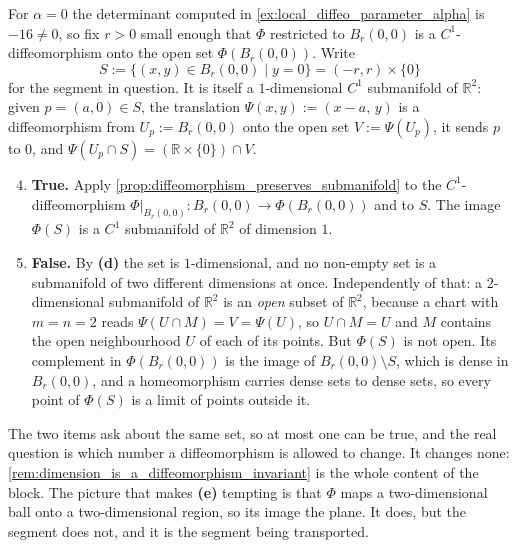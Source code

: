 \begin{exercisesolution}
\label{sol:image_of_segment_submanifold}
For $\alpha = 0$ the determinant computed in \cref{ex:local_diffeo_parameter_alpha} is
$-16 \neq 0$, so fix $r > 0$ small enough that $\Phi$ restricted to $B_r(0,0)$ is a
$C^1$-diffeomorphism onto the open set $\Phi(B_r(0,0))$. Write
\[S := \{(x,y) \in B_r(0,0) \mid y = 0\} = (-r,r) \times \{0\}\]
for the segment in question. It is itself a $1$-dimensional $C^1$ submanifold of $\mathbb{R}^2$:
given $p = (a,0) \in S$, the translation $\Psi(x,y) := (x-a,\, y)$ is a diffeomorphism from
$U_p := B_r(0,0)$ onto the open set $V := \Psi(U_p)$, it sends $p$ to $0$, and
$\Psi(U_p \cap S) = (\mathbb{R}\times\{0\}) \cap V$.
\begin{enumerate}[label=\textbf{(\alph*)}]
  \setcounter{enumi}{3}
  \item \textbf{True.} Apply \cref{prop:diffeomorphism_preserves_submanifold} to the
    $C^1$-diffeomorphism $\Phi|_{B_r(0,0)} : B_r(0,0) \to \Phi(B_r(0,0))$ and to $S$. The image
    $\Phi(S)$ is a $C^1$ submanifold of $\mathbb{R}^2$ of dimension $1$.
  \item \textbf{False.} By \textbf{(d)} the set is $1$-dimensional, and no non-empty set is a
    submanifold of two different dimensions at once. Independently of that: a $2$-dimensional
    submanifold of $\mathbb{R}^2$ is an \emph{open} subset of $\mathbb{R}^2$, because a chart with
    $m = n = 2$ reads $\Psi(U \cap M) = V = \Psi(U)$, so $U \cap M = U$ and $M$ contains the open
    neighbourhood $U$ of each of its points. But $\Phi(S)$ is not open. Its complement in
    $\Phi(B_r(0,0))$ is the image of $B_r(0,0) \setminus S$, which is dense in $B_r(0,0)$, and a
    homeomorphism carries dense sets to dense sets, so every point of $\Phi(S)$ is a limit of
    points outside it.
\end{enumerate}
\begin{remark}
The two items ask about the same set, so at most one can be true, and the real question is which
number a diffeomorphism is allowed to change. It changes none:
\cref{rem:dimension_is_a_diffeomorphism_invariant} is the whole content of the block. The picture
that makes \textbf{(e)} tempting is that $\Phi$ maps a two-dimensional ball onto a two-dimensional
region, so its image  the plane. It does, but the segment does not, and it is the
segment being transported.
\end{remark}
\end{exercisesolution}

